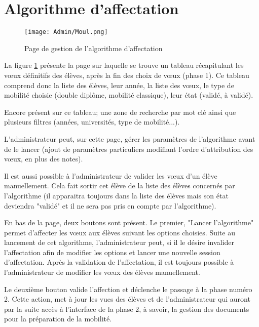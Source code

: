 \section{Algorithme d'affectation}
\label{sec::moulinette}

\begin{figure}[H]
	\texttt{[image: Admin/Moul.png]}
	\caption{Page de gestion de l'algorithme d'affectation}
	\label{fig::moulinette}
\end{figure}

La figure \ref{fig::moulinette} présente la page sur laquelle se trouve un tableau récapitulant les vœux définitifs des élèves, après la fin des choix de vœux (phase 1). Ce tableau comprend donc la liste des élèves, leur année, la liste des vœux, le type de mobilité choisie (double diplôme, mobilité classique), leur état (validé, à validé).

Encore présent sur ce tableau; une zone de recherche par mot clé ainsi que plusieurs filtres (années, universités, type de mobilité...).

\bigbreak

L'administrateur peut, sur cette page, gérer les paramètres de l'algorithme avant de le lancer (ajout de paramètres particuliers modifiant l'ordre d'attribution des vœux, en plus des notes).

\bigbreak

Il est aussi possible à l'administrateur de valider les vœux d'un élève manuellement. Cela fait sortir cet élève de la liste des élèves concernés par l'algorithme (il apparaitra toujours dans la liste des élèves mais son état deviendra "validé" et il ne sera pas pris en compte par l'algorithme).

\bigbreak

En bas de la page, deux boutons sont présent. Le premier, "Lancer l'algorithme" permet d'affecter les vœux aux élèves suivant les options choisies. Suite au lancement de cet algorithme, l'administrateur peut, si il le désire invalider l'affectation afin de modifier les options et lancer une nouvelle session d'affectation. Après la validation de l'affectation, il est toujours possible à l'administrateur de modifier les vœux des élèves manuellement.

\bigbreak

Le deuxième bouton valide l'affection et déclenche le passage à la phase numéro 2. Cette action, met à jour les vues des élèves et de l'administrateur qui auront par la suite accès à l'interface de la phase 2, à savoir, la gestion des documents pour la préparation de la mobilité. 